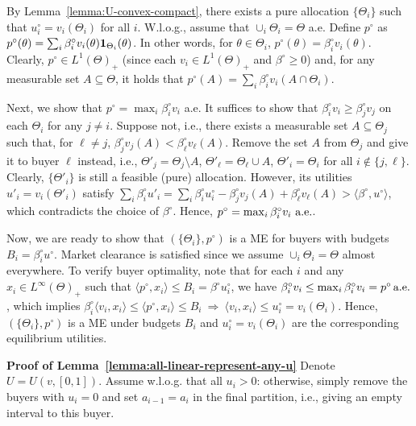 	By Lemma~\ref{lemma:U-convex-compact}, there exists a pure allocation $\{\Theta_i\}$ such that $u^\circ_i = v_i(\Theta_i)$ for all $i$. W.l.o.g., assume that $\cup_i \Theta_i = \Theta$ a.e.
	Define $p^\circ$ as 
	$ p^\circ(\theta) = \sum_i \beta^\circ_i v_i(\theta)\mathbf{1}_{\Theta_i}(\theta)$. 
	In other words, for $\theta\in \Theta_i$, $p^\circ(\theta) = \beta^\circ_i v_i(\theta)$. Clearly, $p^\circ\in L^1(\Theta)_+$ (since each $v_i\in L^1(\Theta)_+$ and $\beta^\circ \geq 0$) and, for any measurable set $A\subseteq \Theta$, it holds that
	$ p^\circ(A) = \sum_i \beta^\circ_i v_i(A\cap \Theta_i)$.
	
	Next, we show that $p^\circ = \max_i \beta^\circ_i v_i$ a.e. It suffices to show that $\beta^\circ_i v_i \geq \beta^\circ_j v_j$ on each $\Theta_i$ for any $j\neq i$. Suppose not, i.e., there exists a measurable set $A\subseteq \Theta_j$ such that, for $\ell \neq j$,
	$ \beta^\circ_j v_j(A) < \beta^\circ_\ell v_\ell(A)$.
	Remove the set $A$ from $\Theta_j$ and give it to buyer $\ell$ instead, i.e., $\Theta'_j = \Theta_j \setminus A$, $\Theta'_\ell = \Theta_\ell \cup A$, $\Theta'_i = \Theta_i$ for all $i \notin \{j, \ell\}$. 
	Clearly, $\{\Theta'_i\}$ is still a feasible (pure) allocation. However, its utilities $u'_i = v_i(\Theta'_i)$ satisfy
	$ \sum_i \beta^\circ_i u'_i = \sum_i \beta^\circ_i u^\circ_i - \beta^\circ_j v_j(A) + \beta^\circ_\ell v_\ell(A) > \langle \beta^\circ, u^\circ\rangle$,
	which contradicts the choice of $\beta^\circ$. 
	Hence,
	$ p^\circ = \max_i \beta^\circ_i v_i \ \almeve$.
	
	Now, we are ready to show that $(\{\Theta_i\}, p^\circ)$ is a ME for buyers with budgets $B_i = \beta^\circ_i u^\circ$. Market clearance is satisfied since we assume $\cup_i \Theta_i = \Theta$ almost everywhere. 
	To verify buyer optimality, note that for each $i$ and any $x_i \in L^\infty(\Theta)_+$ such that $\langle p^\circ, x_i \rangle \leq B_i = \beta^\circ u^\circ_i$, we have 
	$ \beta^\circ_i v_i \leq \max_i \beta^\circ_i v_i = p^\circ \, \textnormal{a.e.}$,
	which implies
	$\beta^\circ_i \langle v_i, x_i \rangle \leq \langle p^\circ, x_i \rangle \leq B_i \ \Rightarrow \ \langle v_i, x_i \rangle \leq u^\circ_i = v_i(\Theta_i)$.
	Hence, $(\{\Theta_i\}, p^\circ)$ is a ME under budgets $B_i$ and $u^\circ_i = v_i(\Theta_i)$ are the corresponding equilibrium utilities.

	\smallskip\noindent\textbf{Proof of Lemma~\ref{lemma:all-linear-represent-any-u}}
	Denote $U = U(v, [0,1])$. 
	Assume w.l.o.g. that all $u_i > 0$: otherwise, simply remove the buyers with $u_i = 0$ and set $a_{i-1} = a_i$ in the final partition, i.e., giving an empty interval to this buyer.

